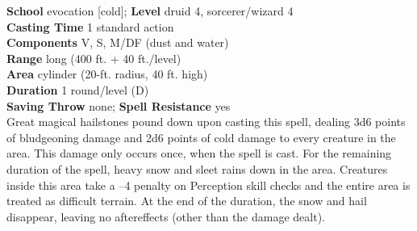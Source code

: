 \textbf{School} evocation [cold]; \textbf{Level} druid 4, sorcerer/wizard 4\\
\textbf{Casting Time} 1 standard action\\
\textbf{Components} V, S, M/DF (dust and water)\\
\textbf{Range} long (400 ft. + 40 ft./level)\\
\textbf{Area} cylinder (20-ft. radius, 40 ft. high)\\
\textbf{Duration} 1 round/level (D)\\
\textbf{Saving Throw} none; \textbf{Spell Resistance} yes\\
Great magical hailstones pound down upon casting this spell, dealing 3d6 points of bludgeoning damage and 2d6 points of cold damage to every creature in the area. This damage only occurs once, when the spell is cast. For the remaining duration of the spell, heavy snow and sleet rains down in the area. Creatures inside this area take a –4 penalty on Perception skill checks and the entire area is treated as difficult terrain. At the end of the duration, the snow and hail disappear, leaving no aftereffects (other than the damage dealt).\\
